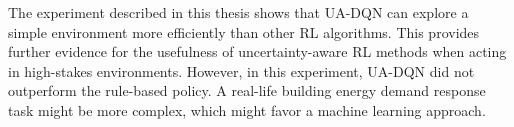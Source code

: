 The experiment described in this thesis shows that UA-DQN can explore a simple environment more efficiently than other RL algorithms.
This provides further evidence for the usefulness of uncertainty-aware RL methods when acting in high-stakes environments.
However, in this experiment, UA-DQN did not outperform the rule-based policy.
A real-life building energy demand response task might be more complex, which might favor a machine learning approach.



